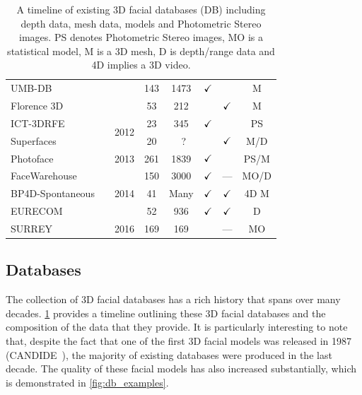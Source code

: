 \begin{table}
{\begin{tabular}{@{}lrcccccc@{}}
UMB-DB                      &\cite{colombo2011umb}          &                       & 143         & 1473        & $\checkmark$       &       & M      \\
Florence 3D                 &\cite{bagdanov2011florence}    &                       & 53          & 212         &             & $\checkmark$ & M      \\ \midrule
ICT-3DRFE                   &\cite{stratou2012exploring}    & \multirow{2}{*}{2012} & 23          & 345         & $\checkmark$       &       & PS     \\
Superfaces                  &\cite{berretti2012superfaces}  &                       & 20          &~?           &             & $\checkmark$ & M/D    \\ \midrule
Photoface                   &\cite{RefWorks:293}            & 2013                  & 261         & 1839        & $\checkmark$       &       & PS/M   \\ \midrule
FaceWarehouse               &\cite{Cao:2014gy}              & \multirow{3}{*}{2014} & 150         & 3000        & $\checkmark$       & ---   & MO/D   \\
BP4D-Spontaneous            &\cite{Zhang:2014id}            &                       & 41          & Many        & $\checkmark$       & $\checkmark$ & 4D M   \\
EURECOM                     &\cite{min2014kinectfacedb}     &                       & 52          & 936         & $\checkmark$       & $\checkmark$ & D      \\ \midrule
SURREY                      &\cite{Huber:F5Dca9zy}          & 2016                  & 169         & 169         &             & ---   & MO     \\ \bottomrule
\end{tabular}%
}
\caption{A timeline of existing 3D facial databases (DB) including depth data, mesh
         data, models and Photometric Stereo images. PS denotes Photometric
         Stereo images, MO is a statistical model, M is a 3D mesh,
         D is depth/range data and 4D implies a 3D video.}
\label{tbl:timeline_db}
\end{table}
\subsection{Databases}\label{subsec:bg_databases}
The collection of 3D facial databases has a rich history
that spans over many decades. \cref{tbl:timeline_db} provides a
timeline outlining these 3D facial databases and the composition of the
data that they provide.
It is particularly interesting to note that, despite the fact that one of the
first 3D facial models was released in 1987 (CANDIDE~\cite{Rydfalk:1987tg}), the
majority of existing databases were produced in the last decade. The quality
of these facial models has also increased substantially, which is demonstrated
in \cref{fig:db_examples}.

